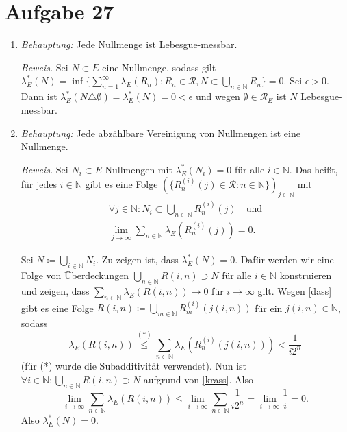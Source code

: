\documentclass[a4paper,DIV=1]{article}
\theoremstyle{plain}
\begin{document}
	
\section*{Aufgabe 27}
\begin{enumerate}[label=(\roman*)]
	\item \textit{Behauptung:} Jede Nullmenge ist Lebesgue-messbar. 

	\textit{Beweis.} Sei $N \subset E$ eine Nullmenge, sodass gilt $\lambda_E^*(N) = \inf\{ \sum\limits_{n = 1}^{\infty} \lambda_E(R_n) : R_n \in \mathcal R, N \subset \bigcup\limits_{n \in \mathbb N} R_n  \} = 0$. Sei $\epsilon > 0$. Dann ist $\lambda_E^*(N \triangle \emptyset) = \lambda_E^*(N) = 0 < \epsilon$ und wegen $\emptyset \in \mathcal R_E$ ist $N$ Lebesgue-messbar.
	
	\item \textit{Behauptung:} Jede abzählbare Vereinigung von Nullmengen ist eine Nullmenge.
	
	\textit{Beweis.} Sei $N_i \subset E$ Nullmengen mit $\lambda_E^*(N_i) = 0$ für alle $i \in \mathbb N$. Das heißt, für jedes $i \in \mathbb N$ gibt es eine Folge $(\{R^{(i)}_n(j) \in \mathcal R : n \in \mathbb N\})_{j \in \mathbb N}$ mit 
	\begin{gather}
		\forall j \in \mathbb N: N_i \subset \bigcup_{n \in \mathbb N} R^{(i)}_n(j) \quad \text{und} \label{krass} \\
		 \lim_{j \to \infty}\sum_{n \in \mathbb N}\lambda_E(R_n^{(i)}(j)) = 0 \label{dass}.
	\end{gather}
	\iffalse
	Wegen $\lambda_E$ nicht negativ ist, muss für die einzelnen Rechteckglieder der Folge $(R_n^{(i)}(j))_{j \in \mathbb N}$ gelten: 
	\[
	 	\forall i,n \in \mathbb N:  \lim_{j \to \infty} \lambda_E(R^{(i)}_n(j)) = 0.
	\]
	\fi
	Sei $N \coloneqq \bigcup_{i \in \mathbb N} N_i$. Zu zeigen ist, dass $\lambda_E^*(N) = 0$. Dafür werden wir eine Folge von Überdeckungen $\bigcup_{n \in \mathbb N}R(i,n) \supset N$ für alle $i \in \mathbb N$ konstruieren und zeigen, dass $\sum_{n \in \mathbb N}\lambda_E(R(i,n)) \to 0$ für $i \to \infty$ gilt. Wegen \eqref{dass} gibt es eine Folge $R(i,n) \coloneqq \bigcup_{m \in \mathbb N} R_m^{(i)}(j(i,n))$ für ein $j(i,n) \in \mathbb N$, sodass 
	\[
		\lambda_E(R(i,n)) \overset{(*)}{\leq} \sum_{n \in \mathbb N}\lambda_E(R_n^{(i)}(j(i,n))) < \frac{1}{i2^{n}}
	\]
	(für (*) wurde die Subadditivität verwendet). Nun ist $\forall i \in \mathbb N: \bigcup_{n \in \mathbb N}R(i,n) \supset N$ aufgrund von \eqref{krass}. Also
	\[
		\lim_{i \to \infty}\sum_{n \in \mathbb N}\lambda_E(R(i,n)) \leq \lim_{i \to \infty} \sum_{n \in \mathbb N} \frac{1}{i2^n} = \lim_{i \to \infty} \frac{1}{i} = 0.
	\]
	Also $\lambda_E^*(N) = 0$.
	

\end{enumerate}
\end{document}
